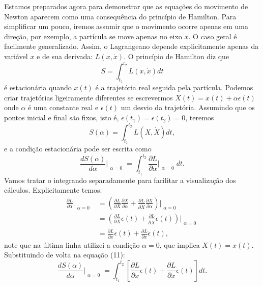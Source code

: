 \documentclass{article}
\begin{document}
Estamos preparados agora para demonstrar que as equações do movimento de Newton aparecem como uma consequência do princípio de Hamilton. Para simplificar um pouco, iremos assumir que o movimento ocorre apenas em uma direção, por exemplo, a partícula se move apenas no eixo $x$. O caso geral é facilmente generalizado. Assim, o Lagrangeano depende explicitamente apenas da variável $x$ e de sua derivada: $L(x,\dot{x})$. O princípio de Hamilton diz que 
\begin{equation}
    S = \int_{t_1}^{t_2}L(x,\dot{x})dt
\end{equation}
é estacionária quando $x(t)$ é a trajetória real seguida pela partícula. Podemos criar trajetórias ligeiramente diferentes se escrevermos $X(t) = x(t) + \alpha\epsilon(t)$ onde $\alpha$ é uma constante real e $\epsilon(t)$ um desvio da trajetória. Assumindo que os pontos inicial e final são fixos, isto é, $\epsilon(t_1) = \epsilon(t_2) = 0$, teremos
\begin{equation}
    S(\alpha) = \int_{t_1}^{t_2}L(X,\dot{X})dt,
\end{equation}
e a condição estacionária pode ser escrita como
\begin{equation}
\frac{dS(\alpha)}{d\alpha}\Bigr|_{\substack{\alpha=0}} = \int_{t_1}^{t_2}\frac{\partial L}{\partial\alpha}\Bigr|_{\substack{\alpha=0}}dt.
\end{equation}
Vamos tratar o integrando separadamente para facilitar a visualização dos cálculos. Explicitamente temos:
\begin{equation}
\begin{split}
    \frac{\partial L}{\partial\alpha}\Bigr|_{\substack{\alpha=0}} & = \left( \frac{\partial L}{\partial X}\frac{\partial X}{\partial\alpha} + \frac{\partial L}{\partial \dot{X}}\frac{\partial \dot{X}}{\partial\alpha} \right)\Bigr|_{\substack{\alpha=0}} \\
    & = \left( \frac{\partial L}{\partial X}\epsilon(t) + \frac{\partial L}{\partial \dot{X}}\dot{\epsilon}(t) \right)\Bigr|_{\substack{\alpha=0}} \\
    & = \frac{\partial L}{\partial x}\epsilon(t) + \frac{\partial L}{\partial \dot{x}}\dot{\epsilon}(t),
    \end{split}
\end{equation}
note que na última linha utilizei a condição $\alpha = 0$, que implica $X(t) = x(t)$. Substituindo de volta na equação (11):
\begin{equation}
\frac{dS(\alpha)}{d\alpha}\Bigr|_{\substack{\alpha=0}} = \int_{t_1}^{t_2}\left[\frac{\partial L}{\partial x}\epsilon(t) + \frac{\partial L}{\partial \dot{x}}\dot{\epsilon}(t)\right]dt.
\end{equation}
\end{document}
